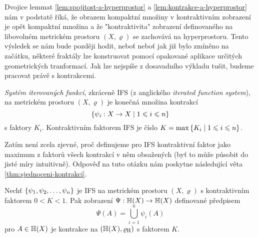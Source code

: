 Dvojice lemmat \ref{lem:spojitost-a-hyperprostor} a \ref{lem:kontrakce-a-hyperprostor} nám v podstatě říká, že obrazem kompaktní množiny v kontraktivním zobrazení je opět kompaktní množina a že "kontraktivita" zobrazení definovaného na libovolném metrickém prostoru $(X,\varrho)$ se zachovává na hyperprostoru. Tento výsledek se nám bude později hodit, neboť neboť jak již bylo zmíněno na začátku, některé fraktály lze konstruovat pomocí opakované aplikace určitých geometrických tranformací. Jak lze nejspíše z dosavadního výkladu tušit, budeme pracovat právě s kontrakcemi.
\begin{definition}\label{def:system-iterovanych-funkci}
    \emph{Systém iterovaných funkcí}, zkráceně IFS (z anglického \emph{iterated function system}), na metrickém prostoru $(X,\varrho)$ je konečná množina kontrakcí
    \[\left\{\psi_i:X \rightarrow X\mid 1\leqslant i\leqslant n\right\}\]
    s faktory $K_i$. Kontraktivním faktorem IFS je číslo $K=\max\left\{K_i\mid 1\leqslant i\leqslant n\right\}$.
\end{definition}
Zatím není zcela zjevné, proč definujeme pro IFS kontraktivní faktor jako maximum z faktorů všech kontrakcí v něm obsažených (byť to může působit do jisté míry intuitivně). Odpověď na tuto otázku nám poskytne následující věta \ref{thm:sjednoceni-kontrakci}.
\begin{theorem}\label{thm:sjednoceni-kontrakci}
    Nechť $\left\{\psi_1,\psi_2,\ldots,\psi_n\right\}$ je IFS na metrickém prostoru $(X,\varrho)$ s kontraktivním faktorem $0<K<1$. Pak zobrazení $\Psi:\mathbb{H}(X) \rightarrow \mathbb{H}(X)$ definované předpisem
    \[\Psi(A)=\bigcup_{i=1}^n\psi_i(A)\]
    pro $A\in\mathbb{H}(X)$ je kontrakce na $(\mathbb{H}(X),\varrho_\textup{H})$ s faktorem $K$.
\end{theorem}

